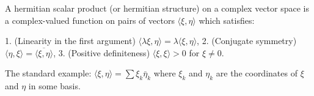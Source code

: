 A hermitian scalar product (or hermitian structure) on a complex vector space is a complex-valued function on pairs of vectors $\langle \xi, \eta \rangle$ which satisfies:

1. (Linearity in the first argument) $\langle \lambda \xi, \eta \rangle = \lambda \langle \xi, \eta \rangle$,
2. (Conjugate symmetry) $\langle \eta, \xi \rangle = \overline{\langle \xi, \eta \rangle}$,
3. (Positive definiteness) $\langle \xi, \xi \rangle > 0$ for $\xi \neq 0$.

The standard example: $\langle \xi, \eta \rangle = \sum \xi_k \bar{\eta}_k$ where $\xi_k$ and $\eta_k$ are the coordinates of $\xi$ and $\eta$ in some basis.

